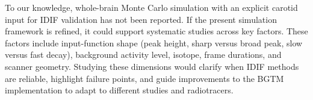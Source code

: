 To our knowledge, whole-brain Monte Carlo simulation with an explicit carotid input for IDIF validation has not been reported.
If the present simulation framework is refined, it could support systematic studies across key factors.
These factors include input-function shape (peak height, sharp versus broad peak, slow versus fast decay), background activity level, isotope, frame durations, and scanner geometry.
Studying these dimensions would clarify when IDIF methods are reliable, highlight failure points, and guide improvements to the BGTM implementation to adapt to different studies and radiotracers.
